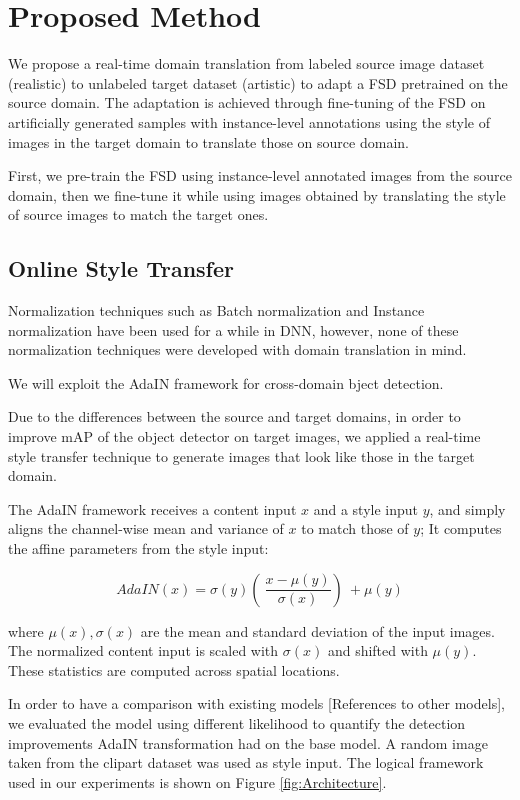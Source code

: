 \documentclass[10pt,twocolumn,letterpaper]{article}
\begin{document}
\section{Proposed Method}
We propose a real-time domain translation from labeled source image dataset (realistic) to unlabeled target dataset (artistic) to adapt a FSD pretrained on the source domain. The adaptation is achieved through fine-tuning of the FSD on artificially generated samples with instance-level annotations using the style of images in the target domain to translate those on source domain.

First, we pre-train the FSD using instance-level annotated images from the source domain, then we fine-tune it while using images obtained by translating the style of source images to match the target ones.

\subsection{Online Style Transfer}
Normalization techniques such as Batch normalization and Instance normalization have been used for a while in DNN, however, none of these normalization techniques were developed with domain translation in mind. 

We will exploit the AdaIN framework \cite{AdaIN} for cross-domain bject detection.

Due to the differences between the source and target domains, in order to improve mAP of the object detector on target images, we applied a real-time style transfer technique to generate images that look like those in the target domain.

The AdaIN framework receives a content input \(x\) and a style input \(y\), and simply aligns the channel-wise mean and variance of \(x\) to match those of \(y\); It computes the affine parameters from the style input:


\[ AdaIN(x)=\sigma(y)\left(\ \frac{x-\mu(y)}{\sigma(x)} \right)\ +\mu(y) \]

where \(\mathit{{\mu(x),\sigma(x)}}\) are the mean and standard deviation of the input images. The normalized content input is scaled with \(\mathit{\sigma(x)}\) and shifted with \(\mathit{\mu(y)}\). These statistics are computed across spatial locations.


In order to have a comparison with existing models [References to other models], we evaluated the model using different likelihood to quantify the detection improvements AdaIN transformation had on the base model. A random image taken from the clipart dataset was used as style input. The logical framework used in our experiments is shown on Figure \ref{fig:Architecture}.
\end{document}
